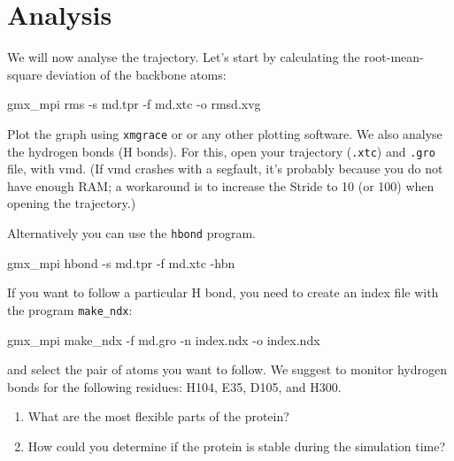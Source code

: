 \documentclass[10pt]{article}
\begin{document}
\section{Analysis}
We will now analyse the trajectory. Let's start by calculating the root-mean-square deviation of the backbone atoms:
\begin{cmdline}
gmx_mpi rms -s md.tpr -f md.xtc -o rmsd.xvg
\end{cmdline}

Plot the graph using \texttt{xmgrace} or  or any other plotting software. We also analyse the hydrogen bonds (H bonds). For this, open your trajectory (\texttt{.xtc}) and \texttt{.gro} file, with vmd. (If vmd crashes with a segfault, it's probably because you do not have enough RAM; a workaround is to increase the Stride to 10 (or 100) when opening the trajectory.)

Alternatively you can use the \texttt{hbond} program. 
\begin{cmdline}
gmx_mpi hbond -s md.tpr -f md.xtc -hbn
\end{cmdline}


If you want to follow a particular H bond, you need to create an index file with the program \texttt{make\_ndx}:

\begin{cmdline}
gmx_mpi make_ndx -f md.gro -n index.ndx -o index.ndx
\end{cmdline}

and select the pair of atoms you want to follow. We suggest to monitor hydrogen bonds for the following residues: H104, E35, D105, and H300. 

\begin{question}
    \begin{enumerate}[leftmargin=0.8cm]
        \renewcommand{\labelenumi}{Q\arabic{enumi}.}
        \setcounter{enumi}{9}
        \item What are the most flexible parts of the protein?
        \item How could you determine if the protein is stable during the simulation time?
    \end{enumerate}
\end{question}

\printbibliography
\end{document}

